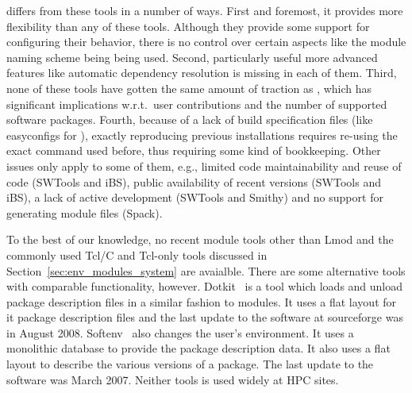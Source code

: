 \easybuild{} differs from these tools in a number of ways. First and foremost, it
provides more flexibility than any of these tools. Although they provide some support
for configuring their behavior, there is no control over certain aspects like the
module naming scheme being being used. Second, particularly useful more advanced
features like automatic dependency resolution is missing in each of them. Third, none
of these tools have gotten the same amount of traction as \easybuild{}, which has
significant implications w.r.t.\ user contributions and the number of supported
software packages. Fourth, because of a lack of build specification files (like
easyconfigs for \easybuild{}), exactly reproducing previous installations requires
re-using the exact command used before, thus requiring some kind of bookkeeping.
Other issues only apply to some of them, e.g., limited code
maintainability and reuse of code (SWTools and iBS), public availability of recent
versions (SWTools and iBS), a lack of active development (SWTools and Smithy) and
no support for generating module files (Spack).

To the best of our knowledge, no recent module tools other than Lmod and the commonly
used Tcl/C and Tcl-only tools discussed in Section~\ref{sec:env_modules_system} are
avaialble. There are some alternative tools with comparable functionality, however.
Dotkit~\cite{dotkit} is a tool which loads and unload package description files in 
a similar fashion to modules. It uses a flat layout for it package description files 
and the last update to the software at sourceforge was in August 2008.  
Softenv~\cite{softenv} also changes the user's environment. It uses a
monolithic database to provide the package description data.  It also
uses a flat layout to describe the various versions of a package.  The
last update to the software was March 2007.  Neither tools is used
widely at HPC sites.

